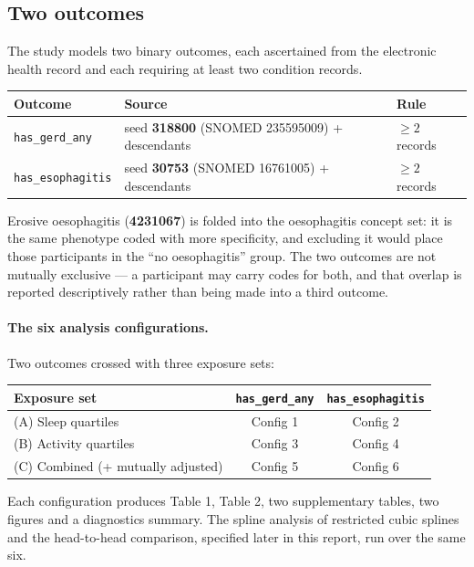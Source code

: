 \documentclass[11pt]{article}
\newcommand{\code}[1]{\texttt{\small #1}}
\begin{document}
\subsection{Two outcomes}
The study models two binary outcomes, each ascertained from the electronic
health record and each requiring at least two condition records.

\begin{table}[h]
\centering
\begin{tabular}{@{}l l l@{}}
\toprule
\textbf{Outcome} & \textbf{Source} & \textbf{Rule} \\
\midrule
\code{has_gerd_any}    & seed \textbf{318800} (SNOMED 235595009) + descendants & $\geq 2$ records \\
\code{has_esophagitis} & seed \textbf{30753} (SNOMED 16761005) + descendants   & $\geq 2$ records \\
\bottomrule
\end{tabular}
\end{table}

\noindent Erosive oesophagitis (\textbf{4231067}) is folded into the
oesophagitis concept set: it is the same phenotype coded with more specificity,
and excluding it would place those participants in the ``no oesophagitis''
group. The two outcomes are not mutually exclusive --- a participant may carry
codes for both, and that overlap is reported descriptively rather than being
made into a third outcome.

\paragraph{The six analysis configurations.} Two outcomes crossed with three
exposure sets:

\begin{table}[h]
\centering
\begin{tabular}{@{}l c c@{}}
\toprule
\textbf{Exposure set} & \textbf{\code{has_gerd_any}} & \textbf{\code{has_esophagitis}} \\
\midrule
(A) Sleep quartiles                  & Config 1 & Config 2 \\
(B) Activity quartiles               & Config 3 & Config 4 \\
(C) Combined (+ mutually adjusted)   & Config 5 & Config 6 \\
\bottomrule
\end{tabular}
\end{table}

\noindent Each configuration produces Table 1, Table 2, two supplementary
tables, two figures and a diagnostics summary. The spline analysis of
restricted cubic splines and the head-to-head comparison, specified later in
this report, run over the same six.
\end{document}
